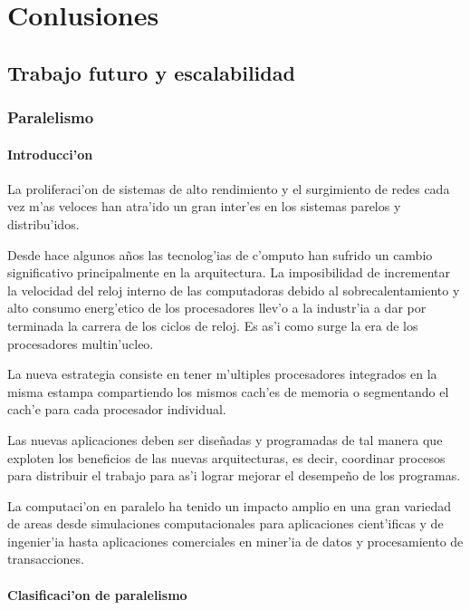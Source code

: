 \chapter{Conlusiones}
\section{Trabajo futuro y escalabilidad}
  \subsection{Paralelismo}
  \subsubsection*{Introducci'on}
  La proliferaci'on de sistemas de alto rendimiento y el surgimiento de redes
  cada vez m'as veloces han atra'ido un gran inter'es en los sistemas parelos
  y distribu'idos.
  
  Desde hace algunos a\~nos las tecnolog'ias de c'omputo han sufrido un cambio significativo
  principalmente en la arquitectura. La imposibilidad de incrementar la velocidad del reloj
  interno de las computadoras debido al sobrecalentamiento y alto consumo energ'etico
  de los procesadores llev'o a la industr'ia a dar por terminada la carrera de los ciclos de reloj.
  Es as'i como surge la era de los procesadores multin'ucleo.

  La nueva estrategia consiste en tener m'ultiples procesadores integrados en la misma estampa compartiendo los mismos
  cach'es de memoria o segmentando el cach'e para cada procesador individual.
  
  Las nuevas aplicaciones deben ser dise\~nadas y programadas de tal manera que exploten los beneficios de las
  nuevas arquitecturas, es decir, coordinar procesos para distribuir el trabajo para as'i lograr mejorar el 
  desempe\~no de los programas.

  La computaci'on en paralelo ha tenido un impacto amplio en una gran variedad 
  de areas desde simulaciones computacionales para aplicaciones cient'ificas
  y de ingenier'ia hasta aplicaciones comerciales en miner'ia de datos y 
  procesamiento de transacciones.
  
  \subsubsection*{Clasificaci'on de paralelismo}
  
